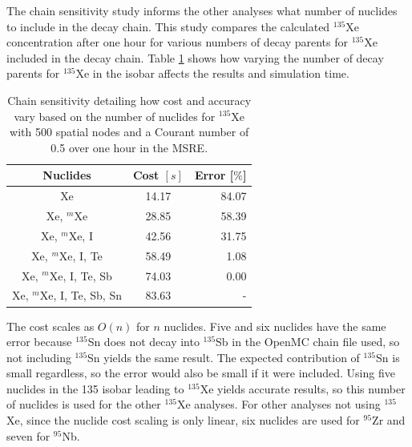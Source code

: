 \documentclass{style/nseJournal}
\begin{document}
The chain sensitivity study informs the other analyses what number of nuclides to include in the decay chain.
This study compares the calculated $^{135}$Xe concentration after one hour for various numbers of decay parents for $^{135}$Xe included in the decay chain.
Table \ref{tab:nuc-ref} shows how varying the number of decay parents for $^{135}$Xe in the isobar affects the results and simulation time.



\begin{table}[!ht]
    \centering
    \caption{Chain sensitivity detailing how cost and accuracy vary based on the number of nuclides for $^{135}$Xe with 500 spatial nodes and a Courant number of 0.5 over one hour in the MSRE.}
    \begin{tabular}{c c r}
       \hline
       Nuclides  & Cost $[s]$ & Error [$\%$]\\
       \hline
        Xe & 14.17 & 84.07\\
        Xe, $^{m}$Xe & 28.85 & 58.39\\
        Xe, $^{m}$Xe, I & 42.56 & 31.75\\
        Xe, $^{m}$Xe, I, Te & 58.49 & 1.08\\
        Xe, $^{m}$Xe, I, Te, Sb & 74.03 & 0.00\\
        Xe, $^{m}$Xe, I, Te, Sb, Sn & 83.63 & -\\
        \hline
    \end{tabular}

    \label{tab:nuc-ref}
\end{table}

The cost scales as $O(n)$ for $n$ nuclides.
Five and six nuclides have the same error because $^{135}$Sn does not decay into $^{135}$Sb in the OpenMC chain file used, so not including $^{135}$Sn yields the same result.
The expected contribution of $^{135}$Sn is small regardless, so the error would also be small if it were included.
Using five nuclides in the 135 isobar leading to $^{135}$Xe yields accurate results, so this number of nuclides is used for the other $^{135}$Xe analyses.
For other analyses not using $^{135}$Xe, since the nuclide cost scaling is only linear, six nuclides are used for $^{95}$Zr and seven for $^{95}$Nb.
\end{document}
